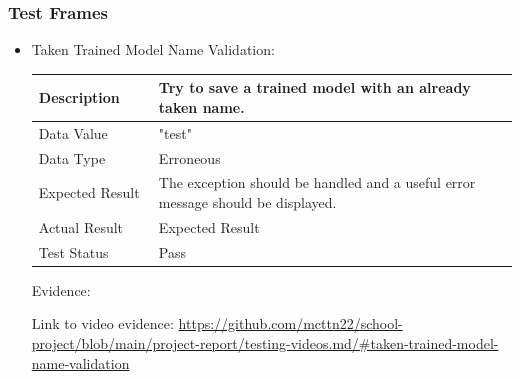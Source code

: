 \documentclass[./project-report/src/latex/project-report.tex]{subfiles}
\begin{document}
\pagebreak

\subsubsection{Test Frames}
\label{sec:test-frames-input-validation}
\begin{itemize}
	\item Taken Trained Model Name Validation: \newline\newline
		\begin{tabular}{|p{0.25\linewidth}|p{0.75\linewidth}|}
			\hline
			Description & Try to save a trained model with an already taken name. \\
			\hline
			Data Value & "test" \\
			\hline
			Data Type & Erroneous \\
			\hline
			Expected Result & The exception should be handled and a useful error message should be displayed. \\
			\hline
			Actual Result & Expected Result \\
			\hline
			Test Status & Pass \\
			\hline
		\end{tabular}

		\vspace{5mm}

		Evidence:
		\begin{figure}[h!]
		\centering
		\end{figure}

		Link to video evidence: \url{https://github.com/mcttn22/school-project/blob/main/project-report/testing-videos.md/#taken-trained-model-name-validation}


\end{itemize}
\end{document}
